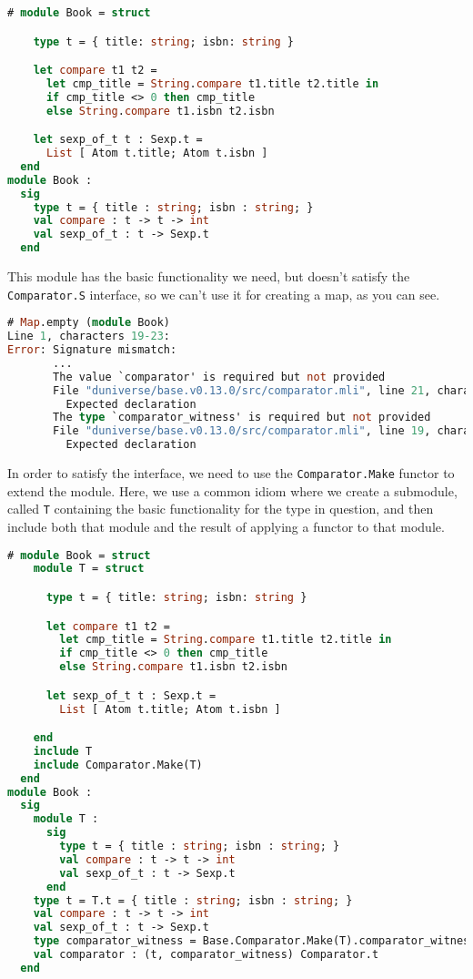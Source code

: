 \begin{lstlisting}[language=Caml]
# module Book = struct

    type t = { title: string; isbn: string }

    let compare t1 t2 =
      let cmp_title = String.compare t1.title t2.title in
      if cmp_title <> 0 then cmp_title
      else String.compare t1.isbn t2.isbn

    let sexp_of_t t : Sexp.t =
      List [ Atom t.title; Atom t.isbn ]
  end
module Book :
  sig
    type t = { title : string; isbn : string; }
    val compare : t -> t -> int
    val sexp_of_t : t -> Sexp.t
  end
\end{lstlisting}

This module has the basic functionality we need, but doesn't satisfy the
\passthrough{\lstinline!Comparator.S!} interface, so we can't use it for
creating a map, as you can see.

\begin{lstlisting}[language=Caml]
# Map.empty (module Book)
Line 1, characters 19-23:
Error: Signature mismatch:
       ...
       The value `comparator' is required but not provided
       File "duniverse/base.v0.13.0/src/comparator.mli", line 21, characters 2-53:
         Expected declaration
       The type `comparator_witness' is required but not provided
       File "duniverse/base.v0.13.0/src/comparator.mli", line 19, characters 2-25:
         Expected declaration
\end{lstlisting}

In order to satisfy the interface, we need to use the
\passthrough{\lstinline!Comparator.Make!} functor to extend the module.
Here, we use a common idiom where we create a submodule, called
\passthrough{\lstinline!T!} containing the basic functionality for the
type in question, and then include both that module and the result of
applying a functor to that module.

\begin{lstlisting}[language=Caml]
# module Book = struct
    module T = struct

      type t = { title: string; isbn: string }

      let compare t1 t2 =
        let cmp_title = String.compare t1.title t2.title in
        if cmp_title <> 0 then cmp_title
        else String.compare t1.isbn t2.isbn

      let sexp_of_t t : Sexp.t =
        List [ Atom t.title; Atom t.isbn ]

    end
    include T
    include Comparator.Make(T)
  end
module Book :
  sig
    module T :
      sig
        type t = { title : string; isbn : string; }
        val compare : t -> t -> int
        val sexp_of_t : t -> Sexp.t
      end
    type t = T.t = { title : string; isbn : string; }
    val compare : t -> t -> int
    val sexp_of_t : t -> Sexp.t
    type comparator_witness = Base.Comparator.Make(T).comparator_witness
    val comparator : (t, comparator_witness) Comparator.t
  end
\end{lstlisting}

